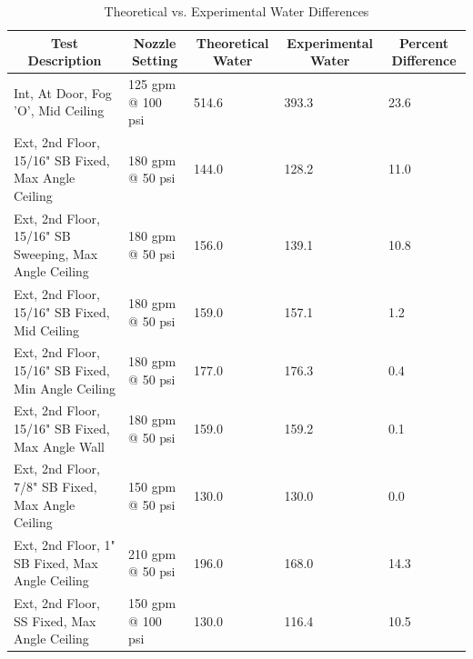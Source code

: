 \documentclass{article}
\begin{document}
\begin{table}[]
\centering
\caption{Theoretical vs. Experimental Water Differences}
\label{Theoretical_vs._Experimental_Water_Differences}
\begin{tabular}{lllll}
\hline
\multicolumn{1}{|c|}{Test Description}                & \multicolumn{1}{c|}{Nozzle Setting} & \multicolumn{1}{c|}{Theoretical Water} & \multicolumn{1}{c|}{Experimental Water} & \multicolumn{1}{c|}{Percent Difference} \\ \hline
Int, At Door, Fog 'O', Mid Ceiling                    & 125 gpm @ 100 psi                   & 514.6                                  & 393.3                                   & 23.6                                    \\
Ext, 2nd Floor, 15/16" SB Fixed, Max Angle Ceiling    & 180 gpm @ 50 psi                    & 144.0                                  & 128.2                                   & 11.0                                    \\
Ext, 2nd Floor, 15/16" SB Sweeping, Max Angle Ceiling & 180 gpm @ 50 psi                    & 156.0                                  & 139.1                                   & 10.8                                    \\
Ext, 2nd Floor, 15/16" SB Fixed, Mid Ceiling          & 180 gpm @ 50 psi                    & 159.0                                  & 157.1                                   & 1.2                                     \\
Ext, 2nd Floor, 15/16" SB Fixed, Min Angle Ceiling    & 180 gpm @ 50 psi                    & 177.0                                  & 176.3                                   & 0.4                                     \\
Ext, 2nd Floor, 15/16" SB Fixed, Max Angle Wall       & 180 gpm @ 50 psi                    & 159.0                                  & 159.2                                   & 0.1                                     \\
Ext, 2nd Floor, 7/8" SB Fixed, Max Angle Ceiling      & 150 gpm @ 50 psi                    & 130.0                                  & 130.0                                   & 0.0                                     \\
Ext, 2nd Floor, 1" SB Fixed, Max Angle Ceiling        & 210 gpm @ 50 psi                    & 196.0                                  & 168.0                                   & 14.3                                    \\
Ext, 2nd Floor, SS Fixed, Max Angle Ceiling           & 150 gpm @ 100 psi                   & 130.0                                  & 116.4                                   & 10.5                                    \\

\end{tabular}
\end{table}
\end{document}
